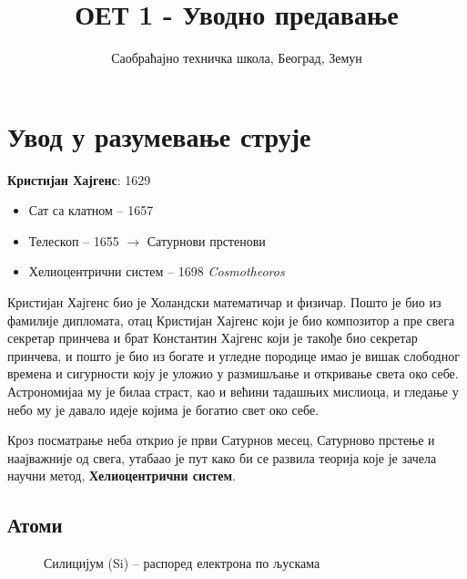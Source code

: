\documentclass{article}
\title{ОЕТ 1 - Уводно предавање}
\author{Саобраћајно техничка школа, Београд, Земун}
\begin{document}
\maketitle


\section{Увод у разумевање струје}


\textbf{Кристијан Хајгенс}: 1629
\begin{itemize}
    \item Сат са клатном -- 1657
    \item Телескоп -- 1655 $\rightarrow$ Сатурнови прстенови
    \item Хелиоцентрични систем -- 1698 \textit{Cosmotheoros}
\end{itemize}

Кристијан Хајгенс био је Холандски математичар и физичар. Пошто је био из фамилије дипломата, отац Кристијан Хајгенс који је био композитор а пре свега секретар принчева и брат Константин Хајгенс 
који је такође био секретар принчева, и пошто је био из богате и угледне породице имао је вишак слободног времена и сигурности коју је уложио у размишљање и  откривање света око себе. Астрономијаа му је билаа страст, као и већини тадашњих мислиоца, и гледање у небо му је давало идеје којима је богатио свет око себе. 

Кроз посматрање неба открио је први Сатурнов месец, Сатурново прстење и наајважније од свега, утабаао је пут како би се развила теорија које је зачела научни метод, \textbf{Хелиоцентрични систем}.

\subsection{Атоми}

\begin{figure}[H]
    \centering
    \caption{Силицијум (Si) -- распоред електрона по љускама}
    \label{fig:si}
\end{figure}
\end{document}
